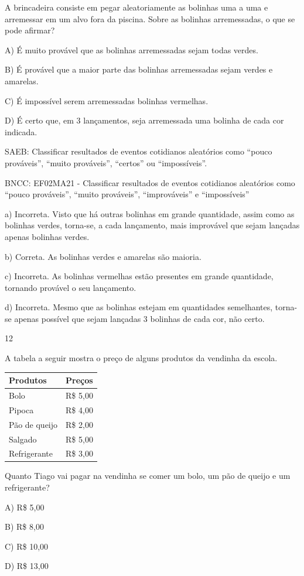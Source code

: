 \begin{escolha}
\begin{escolha}
{{{{{{{{A brincadeira consiste em pegar aleatoriamente as bolinhas uma a uma e
arremessar em um alvo fora da piscina. Sobre as bolinhas arremessadas, o que se pode afirmar?

A) É muito provável que as bolinhas arremessadas sejam todas verdes.

B) É provável que a maior parte das bolinhas arremessadas sejam verdes e amarelas.

C) É impossível serem arremessadas bolinhas vermelhas.

D) É certo que, em 3 lançamentos, seja arremessada uma bolinha de cada cor
indicada.

SAEB: Classificar resultados de eventos cotidianos aleatórios
como ``pouco prováveis'', ``muito prováveis'', ``certos'' ou
``impossíveis''.

BNCC: EF02MA21 - Classificar resultados de eventos cotidianos aleatórios
como ``pouco prováveis'', ``muito prováveis'', ``improváveis'' e
``impossíveis''

a) Incorreta. Visto que há outras bolinhas em grande quantidade, assim
como as bolinhas verdes, torna-se, a cada lançamento, mais improvável
que sejam lançadas apenas bolinhas verdes.

b) Correta. As bolinhas verdes e amarelas são maioria.

c) Incorreta. As bolinhas vermelhas estão presentes em grande
quantidade, tornando provável o seu lançamento.

d) Incorreta. Mesmo que as bolinhas estejam em quantidades semelhantes,
torna-se apenas possível que sejam lançadas 3 bolinhas de cada cor, não certo.

\num{12}

A tabela a seguir mostra o preço de alguns produtos da vendinha da escola.

\begin{longtable}[]{@{}ll@{}}
\toprule
Produtos & Preços\tabularnewline
\midrule
\endhead
Bolo & R\$ 5,00\tabularnewline
Pipoca & R\$ 4,00\tabularnewline
Pão de queijo & R\$ 2,00\tabularnewline
Salgado & R\$ 5,00\tabularnewline
Refrigerante & R\$ 3,00\tabularnewline
\bottomrule
\end{longtable}

Quanto Tiago vai pagar na vendinha se comer um bolo, um pão de queijo e um refrigerante?

A) R\$ 5,00

B) R\$ 8,00

C) R\$ 10,00

D) R\$ 13,00

}}}}}}}}
\end{escolha}
\end{escolha}
